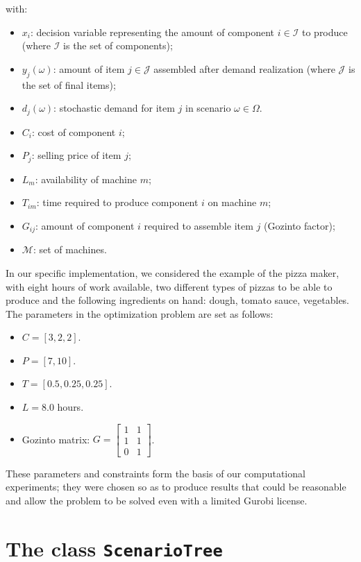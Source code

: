 \documentclass[a4paper,12pt]{article}
\begin{document}
	with:
	
	\begin{itemize}
		\item $x_i$: decision variable representing the amount of component $i \in \mathcal{I}$ to produce (where $\mathcal{I}$ is the set of components);
		\item $y_j(\omega)$: amount of item $j \in \mathcal{J}$ assembled after demand realization (where $\mathcal{J}$ is the set of final items);
		\item $d_j(\omega)$: stochastic demand for item $j$ in scenario $\omega \in \Omega$.
		\item $C_i$: cost of component $i$;
		\item $P_j$: selling price of item $j$;
		\item $L_m$: availability of machine $m$;
		\item $T_{im}$: time required to produce component $i$ on machine $m$;
		\item $G_{ij}$: amount of component $i$ required to assemble item $j$ (Gozinto factor);
		\item $\mathcal{M}$: set of machines.
		
	\end{itemize}
	In our specific implementation, we considered the example of the pizza maker, with eight hours of work available, two different types of pizzas to be able to produce and the following ingredients on hand: dough, tomato sauce, vegetables. The parameters in the optimization problem are set as follows:  
	\begin{itemize}
		\item $C = [3, 2, 2]$.
		\item $P = [7, 10]$.
		\item $T = [0.5, 0.25, 0.25]$.
		\item $L = 8.0$ hours.
		\item Gozinto matrix: $G = \begin{bmatrix} 1 & 1 \\ 1 & 1 \\ 0 & 1 \end{bmatrix}$.
	\end{itemize}
	
	\noindent These parameters and constraints form the basis of our computational experiments; they were chosen so as to produce results that could be reasonable and allow the problem to be solved even with a limited Gurobi license.
	\newpage
	\section{The class \texttt{ScenarioTree}}
	
\end{document}
